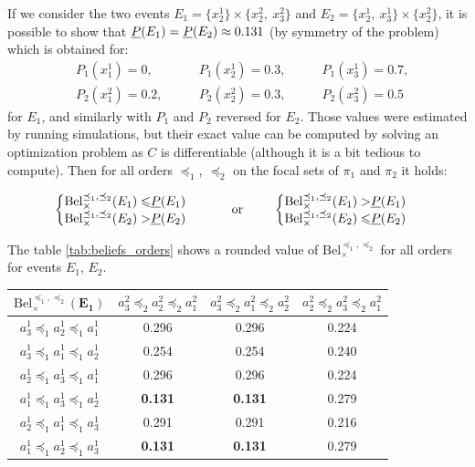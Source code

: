 \begin{example}
If we consider the two events $E_1=\{x^1_2\}\times\{x^2_2,~x^2_3\}$ and $E_2=\{x^1_2,~x^1_3\}\times\{x^2_2\}$, it is possible to show that ${\underline{P}}(E_1)={\underline{P}}(E_2)\approx0.131$ (by symmetry of the problem) which is obtained for:
\begin{align*}
    &P_1(x^1_1)=0, \qquad&P_1(x^1_2)=0.3, \qquad&P_1(x^1_3)=0.7,\\
    &P_2(x^2_1)=0.2, \qquad&P_2(x^2_2)=0.3, \qquad&P_2(x^2_3)=0.5
\end{align*}
for $E_1$, and similarly with $P_1$ and $P_2$ reversed for $E_2$. Those values were estimated by running simulations, but their exact value can be computed by solving an optimization problem as $C$ is differentiable (although it is a bit tedious to compute). Then for all orders $\preceq_1,~\preceq_2$ on the focal sets of $\pi_1$ and $\pi_2$ it holds:

 \begin{align*}
    \begin{cases}
        \begin{split}
            \mathrm{Bel}_\times^{\preceq_1,\preceq_2}(E_1) \leqslant& {\underline{P}}(E_1)\\
            \mathrm{Bel}_\times^{\preceq_1,\preceq_2}(E_2) >& {\underline{P}}(E_2)
        \end{split}
    \end{cases}
    \qquad\text{ or }\qquad
    \begin{cases}
        \begin{split}
            \mathrm{Bel}_\times^{\preceq_1,\preceq_2}(E_1) >& {\underline{P}}(E_1)\\
            \mathrm{Bel}_\times^{\preceq_1,\preceq_2}(E_2) \leqslant& {\underline{P}}(E_2)
        \end{split}
    \end{cases}
\end{align*}

The table \ref{tab:beliefs_orders} shows a rounded value of $\mathrm{Bel}^{\preceq_1,\preceq_2}_\times$ for all orders for events $E_1$, $E_2$.

\begin{table}[!ht]
\centering
\begin{tabular}{|c||c|c|c|}
\hline
$\mathrm{Bel}^{\preceq_1,\preceq_2}_\times(\mathbf{E_1})$ & $a^2_3\preceq_2a^2_2\preceq_2a^2_1$ & $a^2_3\preceq_2a^2_1\preceq_2a^2_2$ & $a^2_2\preceq_2a^2_3\preceq_2a^2_1$ \\ \hline\hline
$a^1_3\preceq_1a^1_2\preceq_1a^1_1$ & 0.296 & 0.296 & 0.224 \\ \hline
$a^1_3\preceq_1a^1_1\preceq_1a^1_2$ & 0.254 & 0.254 & 0.240 \\ \hline
$a^1_2\preceq_1a^1_3\preceq_1a^1_1$ & 0.296 & 0.296 & 0.224 \\ \hline
$a^1_1\preceq_1a^1_3\preceq_1a^1_2$ & \textbf{0.131} & \textbf{0.131} & 0.279 \\ \hline
$a^1_2\preceq_1a^1_1\preceq_1a^1_3$ & 0.291 & 0.291 & 0.216 \\ \hline
$a^1_1\preceq_1a^1_2\preceq_1a^1_3$ & \textbf{0.131} & \textbf{0.131} & 0.279 \\ \hline
\end{tabular}


\end{table}
\end{example}
